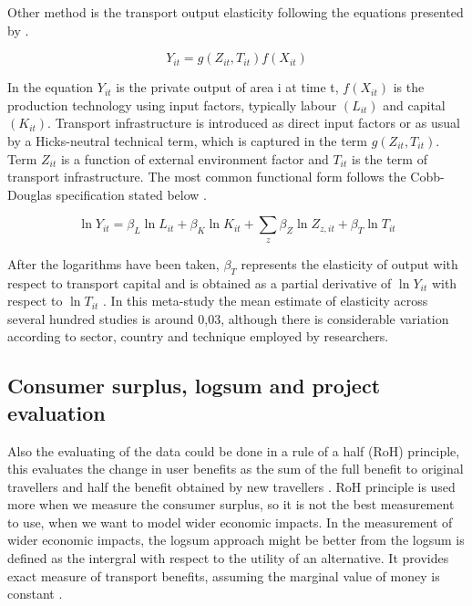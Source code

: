 Other method is the transport output elasticity following the equations presented by \citep{melo}.

\begin{equation}
Y_{it} = g(Z_{it}, T_{it}) f(X_{it})
\end{equation}

In the equation $Y_{it}$ is the private output of area i at time t, $f(X_{it})$ is the production technology using input factors, typically labour $(L_{it})$ and capital $(K_{it})$. Transport infrastructure is introduced as direct input factors or as usual by a Hicks-neutral technical term, which is captured in the term $g(Z_{it}, T_{it})$. Term $Z_{it}$ is a function of external environment factor and $T_{it}$ is the term of transport infrastructure. The most common functional form follows the Cobb-Douglas specification stated below \citep{melo}.

\begin{equation}
\ln Y_{it} = \beta_L \ln L_{it} + \beta_K \ln K_{it} + \sum_z \beta_Z \ln Z_{z, it} + \beta_T \ln T_{it}
\end{equation}

After the logarithms have been taken, $\beta_T$ represents the elasticity of output with respect to transport capital and is obtained as a partial derivative of $\ln Y_{it}$ with respect to $\ln T_{it}$ \citep{melo}. In this meta-study \citep{melo} the mean estimate of elasticity across several hundred studies is around 0,03, although there is considerable variation according to sector, country and technique employed by researchers.\\

 \subsection{Consumer surplus, logsum and project evaluation}
 
Also the evaluating of the data could be done in a rule of a half (RoH) principle, this evaluates the change in user benefits as the sum of the full benefit to original travellers and half the benefit obtained by new travellers \citep{geurs}. RoH principle is used more when we measure the consumer surplus, so it is not the best measurement to use, when we want to model wider economic impacts. In the measurement of wider economic impacts, the logsum approach might be better from \cite{geurs} the logsum is defined as the intergral with respect to the utility of an alternative. It provides exact measure of transport benefits, assuming the marginal value of money is constant \citep{geurs}. \\

